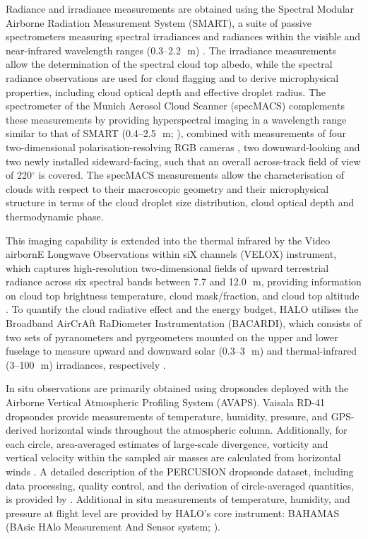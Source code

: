 \documentclass[acp, manuscript]{copernicus}
\begin{document}
Radiance and irradiance measurements are obtained using the Spectral Modular Airborne Radiation Measurement System (SMART), a suite of passive spectrometers measuring spectral irradiances and radiances within the visible and near-infrared wavelength ranges (0.3--2.2\,\unit{\mu m}) \citep{wendischAirborneSpectralAlbedometer2001, wendischACRIDICONCHUVACampaign2016}. The irradiance measurements allow the determination of the spectral cloud top albedo, while the spectral radiance observations are used for cloud flagging and to derive microphysical properties, including cloud optical depth and effective droplet radius.
The spectrometer of the Munich Aerosol Cloud Scanner (specMACS) complements these measurements by providing hyperspectral imaging in a wavelength range similar to that of SMART (0.4--2.5\,\unit{\mu m}; \citealp{ewaldDesignCharacterizationSpecMACS2016}), combined with measurements of four two-dimensional polarisation-resolving RGB cameras \citep{weberPolarizationUpgradeSpecMACS2024}, two downward-looking and two newly installed sideward-facing, such that an overall across-track field of view of 220$^{\circ}$ is covered.
The specMACS measurements allow the characterisation of clouds with respect to their macroscopic geometry and their microphysical structure in terms of the cloud droplet size distribution, cloud optical depth and thermodynamic phase.

This imaging capability is extended into the thermal infrared by the Video airbornE Longwave Observations within siX channels (VELOX) instrument, which captures high-resolution two-dimensional fields of upward terrestrial radiance across six spectral bands between 7.7 and 12.0\,\unit{\mu m}, providing information on cloud top brightness temperature, cloud mask/fraction, and cloud top altitude \citep{schaferVELOXNewThermal2022}.
To quantify the cloud radiative effect and the energy budget, HALO utilises the Broadband AirCrAft RaDiometer Instrumentation (BACARDI), which consists of two sets of pyranometers and pyrgeometers mounted on the upper and lower fuselage to measure upward and downward solar (0.3--3\,\unit{\mu m}) and thermal-infrared (3--100\,\unit{\mu m}) irradiances, respectively \citep{ehrlichNewAirborneBroadband2023}.

In situ observations are primarily obtained using dropsondes deployed with the Airborne Vertical Atmospheric Profiling System (AVAPS). Vaisala RD-41 dropsondes provide measurements of temperature, humidity, pressure, and GPS-derived horizontal winds throughout the atmospheric column. Additionally, for each circle, area-averaged estimates of large-scale divergence, vorticity and vertical velocity within the sampled air masses are calculated from horizontal winds \citep{bonyMeasuringAreaAveragedVertical2019}.
A detailed description of the PERCUSION dropsonde dataset, including data processing, quality control, and the derivation of circle-averaged quantities, is provided by \cite{gloecknerBEACHBarbadosEastern2026}.
Additional in situ measurements of temperature, humidity, and pressure at flight level are provided by HALO's core instrument: BAHAMAS (BAsic HAlo Measurement And Sensor system; \citealp{krautstrunkTransitionFALCONHALO2012}).
\end{document}
